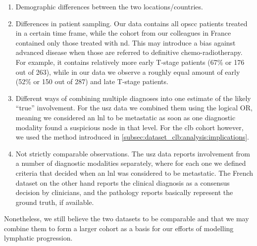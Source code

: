 \documentclass[\relativeRoot/main.tex]{subfiles}
\begin{document}
\begin{enumerate}
    \item Demographic differences between the two locations/countries.
    \item Differences in patient sampling. Our data contains all \gls{opscc} patients treated in a certain time frame, while the cohort from our colleagues in France contained only those treated with \acrlong{nd}. This may introduce a bias against advanced disease when those are referred to definitive chemo-radiotherapy. For example, it contains relatively more early T-stage patients (67\% or 176 out of 263), while in our data we observe a roughly equal amount of early (52\% or 150 out of 287) and late T-stage patients.
    \item Different ways of combining multiple diagnoses into one estimate of the likely ``true'' involvement. For the \gls{usz} data we combined them using the logical OR, meaning we considered an \gls{lnl} to be metastatic as soon as one diagnostic modality found a suspicious node in that level. For the \gls{clb} cohort however, we used the method introduced in \cref{subsec:dataset_clb:analysis:implications}.
    \item Not strictly comparable observations. The \gls{usz} data reports involvement from a number of diagnostic modalities separately, where for each one we defined criteria that decided when an \gls{lnl} was considered to be metastatic. The French dataset on the other hand reports the clinical diagnosis as a consensus decision by clinicians, and the pathology reports basically represent the ground truth, if available.
\end{enumerate}

Nonetheless, we still believe the two datasets to be comparable and that we may combine them to form a larger cohort as a basis for our efforts of modelling lymphatic progression. 
\end{document}
